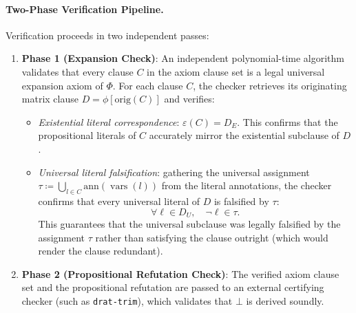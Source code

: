 \documentclass[runningheads]{llncs}
\DeclareMathOperator{\vars}{vars}
\begin{document}
\paragraph*{Two-Phase Verification Pipeline.}
Verification proceeds in two independent passes:
\begin{enumerate}
    \item \textbf{Phase 1 (Expansion Check)}:
          An independent polynomial-time algorithm validates that every clause $C$ in the axiom clause set is a legal universal expansion axiom of $\Phi$.
          For each clause $C$, the checker retrieves its originating matrix clause $D = \phi[\mathrm{orig}(C)]$ and verifies:
          \begin{itemize}
              \item \emph{Existential literal correspondence}: $\varepsilon(C) = D_E$.
                    This confirms that the propositional literals of $C$ accurately mirror the existential subclause of $D$.
              \item \emph{Universal literal falsification}: gathering the universal assignment $\tau \coloneqq \bigcup_{l \in C} \mathrm{ann}(\vars(l))$ from the literal annotations, the checker confirms that every universal literal of $D$ is falsified by $\tau$:
                    \begin{equation}
                        \forall \ell \in D_U, \quad \neg\ell \in \tau .
                    \end{equation}
                    This guarantees that the universal subclause was legally falsified by the assignment $\tau$ rather than satisfying the clause outright (which would render the clause redundant).
          \end{itemize}
    \item \textbf{Phase 2 (Propositional Refutation Check)}:
          The verified axiom clause set and the propositional refutation are passed to an external certifying checker (such as \texttt{drat-trim}), which validates that $\bot$ is derived soundly.
\end{enumerate}

\end{document}
